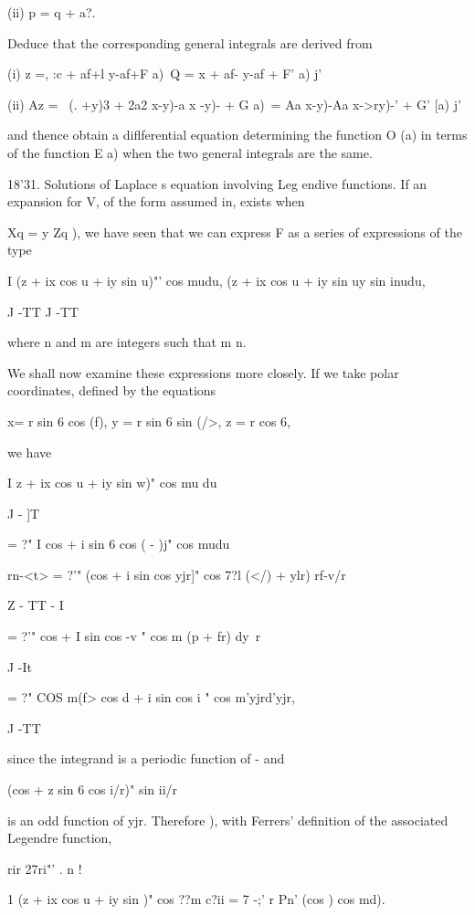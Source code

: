 (ii) p = q + a?.

Deduce that the corresponding general integrals are derived from

(i) z =, :c + af+l y-af+F a)\ Q = x + af- y-af + F' a) j'

(ii) Az = \ (. +y)3 + 2a2 x-y)-a x -y)- + G a)\ = Aa x-y)-Aa x->ry)-'
+ G' [a) j'

and thence obtain a diflferential equation determining the function O
(a) in terms of the function E a) when the two general integrals are
the same.

18'31. Solutions of Laplace s equation involving Leg endive functions.
If an expansion for V, of the form assumed in, exists when

Xq = y Zq ), we have seen that we can express F as a series of
expressions of the type

I (z + ix cos u + iy sin u)"' cos mudu, (z + ix cos u + iy sin uy sin
inudu,

J -TT J -TT

where n and m are integers such that m n.

We shall now examine these expressions more closely. If we take polar
coordinates, defined by the equations

x= r sin 6 cos (f), y = r sin 6 sin (/>, z = r cos 6,

%
%

we have

I z + ix cos u + iy sin w)" cos mu du

J - ]T

= ?" I cos + i sin 6 cos ( - )j" cos mudu

rn-<t> = ?'" (cos + i sin cos yjr]" cos 7?l (</) + ylr) rf-v/r

Z - TT - I

= ?'" cos + I sin cos -v " cos m (p + fr) dy\ r

J -It

= ?" COS m(f> cos d + i sin cos i " cos m'yjrd'yjr,

J -TT

since the integrand is a periodic function of - and

(cos + z sin 6 cos i/r)" sin ii/r

is an odd function of yjr. Therefore ), with Ferrers'
definition of the associated Legendre function,

rir 27ri"' . n !

1 (z + ix cos u + iy sin )" cos ??m c?ii = 7 -;' r Pn' (cos ) cos md).

